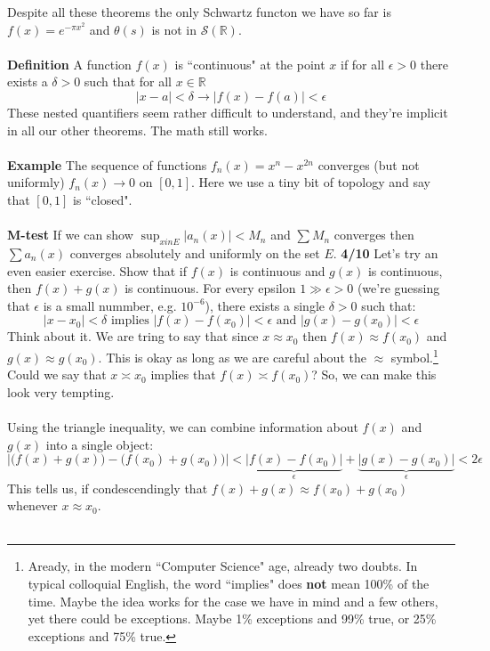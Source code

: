 \documentclass[12pt]{article}
\begin{document}
Despite all these theorems the only Schwartz functon we have so far is $f(x) = e^{- \pi x^2}$ and $\theta(s)$ is not in $\mathcal{S}(\mathbb{R})$. \\ \\
\textbf{Definition} A function $f(x)$ is ``continuous" at the point $x$ if for all $\epsilon > 0$ there exists a $\delta > 0$ such that for all $x \in \mathbb{R}$ 
$$ |x-a| < \delta \to |f(x) - f(a) | < \epsilon $$
These nested quantifiers seem rather difficult to understand, and they're implicit in all our other theorems.  The math still works.  \\ \\
\textbf{Example} The sequence of functions $f_n(x) = x^n - x^{2n}$ converges (but not uniformly) $f_n(x) \to 0$ on $[0,1]$.  Here we use a tiny bit of topology and say that $[0,1]$ is ``closed". \\ \\
\textbf{M-test} If we can show $\sup_{x in E} |a_n(x)| < M_n$ and $\sum M_n$ converges then $\sum a_n(x)$ converges absolutely and uniformly on the set $E$. 
\newpage 
\noindent \textbf{4/10} Let's try an even easier exercise.  Show that if $f(x)$ is continuous and $g(x)$ is continuous, then $f(x) + g(x)$ is continuous.  For every epsilon $1 \gg \epsilon > 0$ (we're guessing that $\epsilon$ is a small nummber, e.g. $10^{-6}$), there exists a single $\delta > 0$ such that:
$$ |x - x_0| < \delta \text{ implies }|f(x) - f(x_0)| < \epsilon \text{ and }|g(x) - g(x_0)| < \epsilon $$
Think about it.  We are tring to say that since $x \approx x_0$ then $f(x) \approx f(x_0)$ and $g(x) \approx g(x_0)$.  This is okay as long as we are careful about the $\approx$ symbol.\footnote{Aready, in the modern ``Computer Science" age, already two doubts.  In typical colloquial English, the word ``implies" does \textbf{not} mean 100\% of the time.  Maybe the idea works for the case we have in mind and a few others, yet there could be exceptions.  Maybe 1\% exceptions and 99\% true, or 25\% exceptions and 75\% true.} Could we say that $x \asymp x_0$ implies that $f(x) \asymp f(x_0)$?  So, we can make this look very tempting. \\ \\
Using the triangle inequality, we can combine information about $f(x)$ and $g(x)$ into a single object:
$$ \big| \big(f(x)+g(x)\big) - \big(f(x_0) + g(x_0)\big) \big| < \underbrace{|f(x) - f(x_0)|}_{\epsilon} + \underbrace{|g(x) - g(x_0)|}_{\epsilon} < 2\epsilon $$
This tells us, if condescendingly that $f(x) + g(x) \approx f(x_0) + g(x_0)$ whenever $x \approx x_0$. \\ \\
\end{document}
